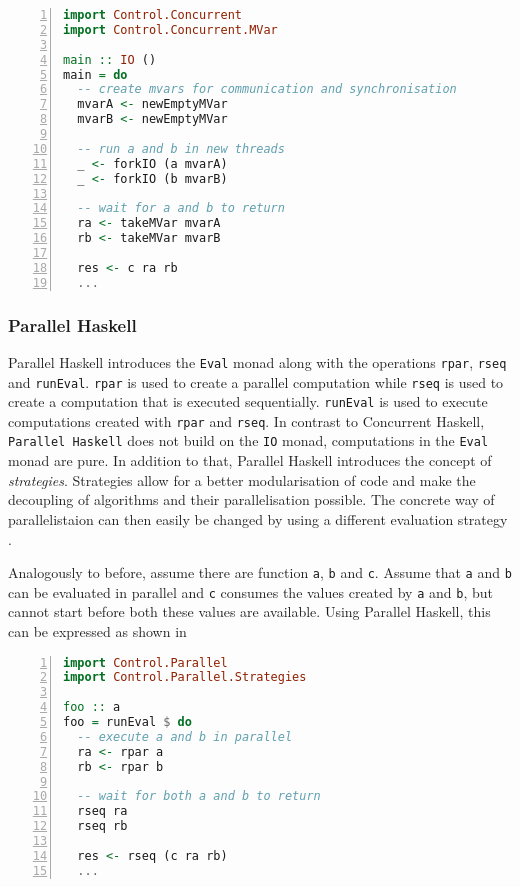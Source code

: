 \begin{lstlisting}[language=Haskell, numbers=left, frame=bt, label=lst:example_concurrent_haskell, caption={Parallel and sequential composition in \textsf{Concurrent Haskell}.}]
import Control.Concurrent
import Control.Concurrent.MVar

main :: IO ()
main = do
  -- create mvars for communication and synchronisation
  mvarA <- newEmptyMVar
  mvarB <- newEmptyMVar  
  
  -- run a and b in new threads
  _ <- forkIO (a mvarA)
  _ <- forkIO (b mvarB)  
  
  -- wait for a and b to return
  ra <- takeMVar mvarA
  rb <- takeMVar mvarB
  
  res <- c ra rb
  ...
\end{lstlisting}

\subsubsection{Parallel Haskell}
\textsf{Parallel Haskell} introduces the \texttt{Eval} monad along with the operations \texttt{rpar}, \texttt{rseq} and \texttt{runEval}. \texttt{rpar} is used to create a parallel computation while \texttt{rseq} is used to create a computation that is executed sequentially. \texttt{runEval} is used to execute computations created with \texttt{rpar} and \texttt{rseq}. In contrast to \textsf{Concurrent Haskell}, \texttt{Parallel Haskell} does not build on the \texttt{IO} monad, computations in the \texttt{Eval} monad are pure. In addition to that, \textsf{Parallel Haskell} introduces the concept of \textit{strategies}. Strategies allow for a better modularisation of code and make the decoupling of algorithms and their parallelisation possible. The concrete way of parallelistaion can then easily be changed by using a different evaluation strategy \cite{Marlow}.

Analogously to before, assume there are function \texttt{a}, \texttt{b} and \texttt{c}. Assume that \texttt{a} and \texttt{b} can be evaluated in parallel and \texttt{c} consumes the values created by \texttt{a} and \texttt{b}, but cannot start before both these values are available. Using \textsf{Parallel Haskell}, this can be expressed as shown in 
\begin{lstlisting}[language=Haskell, numbers=left, frame=bt, label=lst:example_parallel_haskell, caption={Parallel and sequential composition in \textsf{Parallel Haskell}.}]
import Control.Parallel
import Control.Parallel.Strategies

foo :: a
foo = runEval $ do
  -- execute a and b in parallel
  ra <- rpar a
  rb <- rpar b
  
  -- wait for both a and b to return
  rseq ra
  rseq rb
  
  res <- rseq (c ra rb)
  ...
\end{lstlisting}
